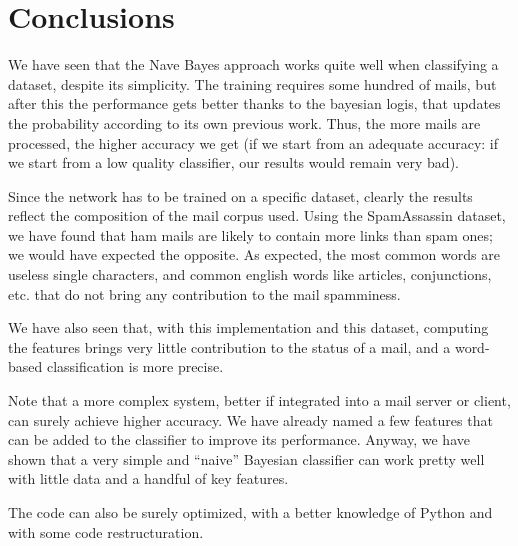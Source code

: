 \section{Conclusions}
We have seen that the Nave Bayes approach works quite well when classifying a dataset, despite its simplicity. The training requires some hundred of mails, but after this the performance gets better thanks to the bayesian logis, that updates the probability according to its own previous work. Thus, the more mails are processed, the higher accuracy we get (if we start from an adequate accuracy: if we start from a low quality classifier, our results would remain very bad).

Since the network has to be trained on a specific dataset, clearly the results reflect the composition of the mail corpus used. Using the SpamAssassin dataset, we have found that ham mails are likely to contain more links than spam ones; we would have expected the opposite. As expected, the most common words are useless single characters, and common english words like articles, conjunctions, etc. that do not bring any contribution to the mail spamminess.

We have also seen that, with this implementation and this dataset, computing the features brings very little contribution to the status of a mail, and a word-based classification is more precise.

Note that a more complex system, better if integrated into a mail server or client, can surely achieve higher accuracy. We have already named a few features that can be added to the classifier to improve its performance. Anyway, we have shown that a very simple and ``naive'' Bayesian classifier can work pretty well with little data and a handful of key features.

The code can also be surely optimized, with a better knowledge of Python and with some code restructuration.

